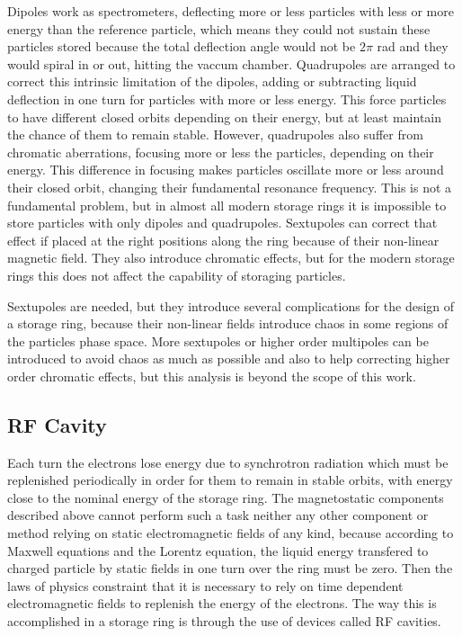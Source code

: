 \documentclass[
	12pt,				%
	openright,			%
	oneside,			%
	a4paper,		%
	chapter=TITLE,		%
	section=TITLE,		%
    brazil,				%
	english,			%
	sumario=tradicional,
	]{abntex2}
\begin{document}
    Dipoles work as spectrometers, deflecting more or less particles with less or more energy than the reference particle, which means they could not sustain these particles stored because the total deflection angle would not be $2\pi$ rad and they would spiral in or out, hitting the vaccum chamber. Quadrupoles are arranged to correct this intrinsic limitation of the dipoles, adding or subtracting liquid deflection in one turn for particles with more or less energy. This force particles to have different closed orbits depending on their energy, but at least maintain the chance of them to remain stable. However, quadrupoles also suffer from chromatic aberrations, focusing more or less the particles, depending on their energy. This difference in focusing makes particles oscillate more or less around their closed orbit, changing their fundamental resonance frequency. This is not a fundamental problem, but in almost all modern storage rings it is impossible to store particles with only dipoles and quadrupoles. Sextupoles can correct that effect if placed at the right positions along the ring because of their non-linear magnetic field. They also introduce chromatic effects, but for the modern storage rings this does not affect the capability of storaging particles.

    Sextupoles are needed, but they introduce several complications for the design of a storage ring, because their non-linear fields introduce chaos in some regions of the particles phase space. More sextupoles or higher order multipoles can be introduced to avoid chaos as much as possible and also to help correcting higher order chromatic effects, but this analysis is beyond the scope of this work.

    \subsection{RF Cavity}

    Each turn the electrons lose energy due to synchrotron radiation which must be replenished periodically in order for them to remain in stable orbits, with energy close to the nominal energy of the storage ring. The magnetostatic components described above cannot perform such a task neither any other component or method relying on static electromagnetic fields of any kind, because according to Maxwell equations and the Lorentz equation, the liquid energy transfered to charged particle by static fields in one turn over the ring must be zero. Then the laws of physics constraint that it is necessary to rely on time dependent electromagnetic fields to replenish the energy of the electrons. The way this is accomplished in a storage ring is through the use of devices called RF cavities.
\end{document}
